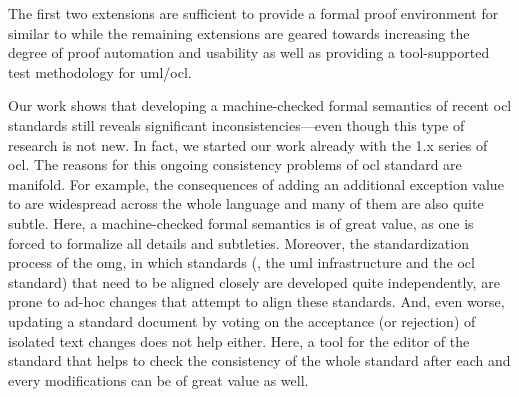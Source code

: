 The first two extensions are sufficient to provide a formal proof
environment for  similar to \holocl while the remaining
extensions are geared towards increasing the degree of proof
automation and usability as well as providing a tool-supported test
methodology for \acs{uml}/\acs{ocl}.


Our work shows that developing a machine-checked formal semantics of
recent \acs{ocl} standards still reveals significant
inconsistencies---even though this type of research is not new. In
fact, we started our work already with the 1.x series of
\acs{ocl}. The reasons for this ongoing consistency problems of
\acs{ocl} standard are manifold. For example, the consequences of
adding an additional exception value to  are widespread across
the whole language and many of them are also quite subtle. Here, a
machine-checked formal semantics is of great value, as one is forced
to formalize all details and subtleties.  Moreover, the
standardization process of the \acs{omg}, in which standards (\eg, the
\acs{uml} infrastructure and the \acs{ocl} standard) that need to be
aligned closely are developed quite independently, are prone to ad-hoc
changes that attempt to align these standards. And, even worse,
updating a standard document by voting on the acceptance (or
rejection) of isolated text changes does not help either. Here, a tool
for the editor of the standard that helps to check the consistency of
the whole standard after each and every modifications can be of great
value as well.

